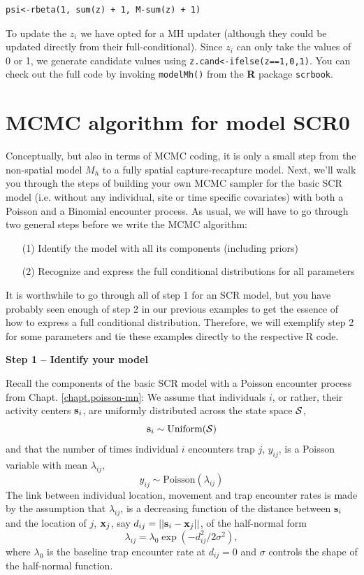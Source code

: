 \begin{verbatim}
psi<-rbeta(1, sum(z) + 1, M-sum(z) + 1)
\end{verbatim}

To update the $z_{i}$ we have opted for a MH updater 
(although they could be updated directly from their
full-conditional). Since $z_{i}$ can only take the values of 0 or 1, we generate candidate values using \verb#z.cand<-ifelse(z==1,0,1)#.
You can check out the full code by invoking \mbox{\tt modelMh()} from the {\bf R} package \mbox{\tt scrbook}.

\section{MCMC algorithm for model SCR0}

Conceptually, but also in terms of MCMC coding, it is only a small
step from the non-spatial model $M_h$ to a fully spatial
capture-recapture model. Next, we'll walk you through the steps of
building your own MCMC sampler for the basic SCR model (i.e. without
any individual, site or time specific covariates) with both a Poisson
and a Binomial encounter process.  As usual, we will have to go
through two general steps before we write the MCMC algorithm:
\begin{itemize}
\item[  (1)] Identify the model with all its components (including
    priors)
\item[  (2)] Recognize and express the full conditional distributions for
    all parameters
\end{itemize}
It is worthwhile to go through all of step 1 for an SCR model, but you
have probably seen enough of step 2 in our previous examples to get
the essence of how to express a full conditional
distribution. Therefore, we will exemplify step 2 for some parameters
and tie these examples directly to the respective R code.

{\bf Step 1 -- Identify your model}

Recall the components of the basic SCR model with a Poisson encounter process from Chapt. \ref{chapt.poisson-mn}:
We assume that individuals $i$, or rather, their activity centers
${\bf s}_i$, are uniformly distributed across the state space ${\cal S}$,
\[
{\bf s}_i  \sim \mbox{Uniform}({\cal S})
\]
and that the number of times individual $i$ encounters trap $j$, $y_{ij}$, is a Poisson variable with mean $\lambda_{ij}$,
\[
y_{ij} \sim \mbox{Poisson}(\lambda_{ij})
\]
The link between individual location, movement and trap encounter
rates is made by the assumption that $\lambda_{ij}$, is a decreasing
function of the distance between ${\bf s}_i$ and the location of $j$,
${\bf x}_{j}$, say $d_{ij} = ||{\bf s}_{i} - {\bf x}_{j}||$, of the half-normal form
\[
\lambda_{ij} =  \lambda_0  \exp(-d_{ij}^2/2\sigma^2),
\]
where $\lambda_0$ is the baseline trap encounter rate at $d_{ij}=0$ and $\sigma$ controls the shape of the half-normal function.

